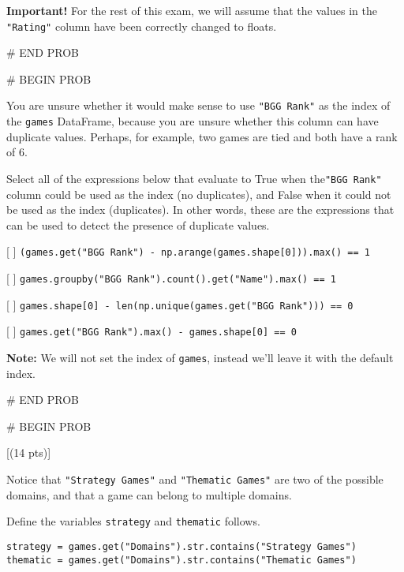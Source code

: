 \documentclass[twoside,12pt]{article}
\begin{document}
\textbf{Important!} For the rest of this exam, we will assume that the values in the \texttt{"Rating"} column have been correctly changed to floats. 



# END PROB

\vspace{0.5in}

# BEGIN PROB



You are unsure whether it would make sense to use \texttt{"BGG Rank"} as the index of the \texttt{games} DataFrame, because you are unsure whether this column can have duplicate values. Perhaps, for example, two games are tied and both have a rank of 6. 

Select all of the expressions below that evaluate to True when the\texttt{"BGG Rank"} column could be used as the index (no duplicates), and False when it could not be used as the index (duplicates). In other words, these are the expressions that can be used to detect the presence of duplicate values.

\vspace{0.1in}

[ ] \texttt{(games.get("BGG Rank") - np.arange(games.shape[0])).max() == 1}

[ ] \texttt{games.groupby("BGG Rank").count().get("Name").max() == 1}

[ ] \texttt{games.shape[0] - len(np.unique(games.get("BGG Rank"))) == 0}

[ ] \texttt{games.get("BGG Rank").max() - games.shape[0] == 0}

\vspace{0.1in}

\textbf{Note:} We will not set the index of \texttt{games}, instead we'll leave it with the default index.


# END PROB

\newpage
# BEGIN PROB

[(14 pts)]

        Notice that \texttt{"Strategy Games"} and \texttt{"Thematic Games"} are two of the possible domains, and that a game can belong to multiple domains. 

        Define the variables \texttt{strategy} and \texttt{thematic} follows.

\begin{verbatim}
strategy = games.get("Domains").str.contains("Strategy Games")
thematic = games.get("Domains").str.contains("Thematic Games")
\end{verbatim}
\end{document}
